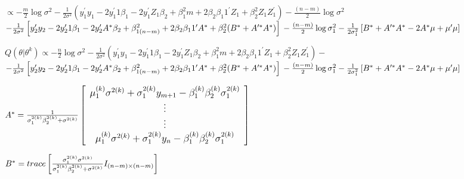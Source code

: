 \documentclass{article}\usepackage[]{graphicx}\usepackage[]{color}
\begin{document}
\vspace{7mm}
$\propto -\frac{m}{2}\log \sigma^{2}-\frac{1}{2\sigma^{2}}(y_{1}^{\prime}y_{1}-2y_{1}^{\prime}1\beta_{1}
-2y_{1}^{\prime}Z_{1}\beta_{2}+\beta_{1}^{2}m+2\beta_{2}\beta_{1}1^{\prime}Z_{1}+\beta_{2}^{2}Z_{1}Z_{1}^{\prime})-\frac{(n-m)}{2}\log \sigma^{2}$\\
$-\frac{1}{2\sigma^{2}}\left[y_{2}^{\prime}y_{2}-2y_{2}^{\prime
}1\beta_{1}  -2y_{2}^{\prime
}\\
A^{*}\beta_{2} +\beta_{1(n-m)}^{2}+2\beta_{2}\beta_{1}1^{\prime}A^{*}+\beta_{2}^{2}(B^{*}+A^{\prime *}A^{*})\right]\\
-\frac{(n-m)}{2}\log \sigma^{2}_{1}-\frac{1}{2\sigma^{2}_{1}}\left[B^{*}+A^{\prime *}A^{*}-2A^{*}\mu+\mu^{\prime}\mu  \right]$

\vspace{7mm}
$Q(\theta|\theta^{k})\propto -\frac{n}{2}\log \sigma^{2}-\frac{1}{2\sigma^{2}}(y_{1}^{\prime}y_{1}-2y_{1}^{\prime}1\beta_{1}
-2y_{1}^{\prime}Z_{1}\beta_{2}+\beta_{1}^{2}m+2\beta_{2}\beta_{1}1^{\prime}Z_{1}+\beta_{2}^{2}Z_{1}Z_{1}^{\prime})-$\\
$-\frac{1}{2\sigma^{2}}\left[y_{2}^{\prime}y_{2}-2y_{2}^{\prime}1\beta_{1}  -2y_{2}^{\prime
}\\
A^{*}\beta_{2} +\beta_{1(n-m)}^{2}+2\beta_{2}\beta_{1}1^{\prime}A^{*}+\beta_{2}^{2}(B^{*}+A^{\prime *}A^{*})\right]\\
-\frac{(n-m)}{2}\log \sigma^{2}_{1}-\frac{1}{2\sigma^{2}_{1}}\left[B^{*}+A^{\prime *}A^{*}-2A^{*}\mu+\mu^{\prime}\mu  \right]$

\vspace{5mm}
$\large{A^{*}}=\frac{1}{\sigma^{2(k)}_{1}\beta_{2}^{2(k)}+\sigma^{2(k)}}\left[\begin{array}{c} \mu_{1}^{(k)}\sigma^{2(k)}+\sigma_{1}^{2(k)}y_{m+1}-\beta_{1}^{(k)}\beta_{2}^{(k)}\sigma_{1}^{2(k)}\\ \vdots \\ \vdots \\ \mu_{1}^{(k)}\sigma^{2(k)}+\sigma_{1}^{2(k)}y_{n}-\beta_{1}^{(k)}\beta_{2}^{(k)}\sigma_{1}^{2(k)} \end{array} \right]$


\vspace{7mm}
$B^{*}=trace  \left[\frac{\sigma^{2(k)}_{1}\sigma^{2(k)}}{\sigma^{2(k)}_{1}\beta_{2}^{2(k)}+\sigma^{2(k)}}\Huge{I_{(n-m)\times(n-m)}} \right]$ \vspace{5mm}\\
\end{document}
